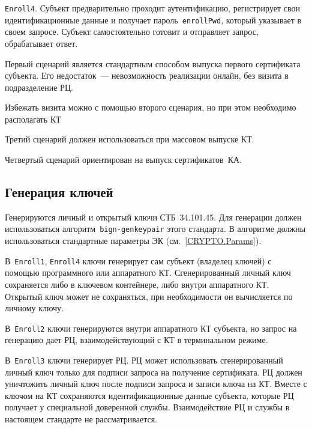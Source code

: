 \texttt{Enroll4}.
Субъект предварительно проходит аутентификацию, регистрирует свои 
идентификационные данные и получает пароль~\texttt{enrollPwd}, 
который указывает в своем запросе. Субъект самостоятельно готовит и 
отправляет запрос, обрабатывает ответ.

Первый сценарий является стандартным способом выпуска первого сертификата
субъекта.  Его недостаток~--- невозможность реализации онлайн, 
без визита в подразделение РЦ. 

Избежать визита можно с помощью второго сценария, но при этом необходимо 
располагать КТ 

Третий сценарий должен использоваться при массовом выпуске КТ.

Четвертый сценарий ориентирован на выпуск сертификатов~КА.


\subsection{Генерация ключей}\label{PROCESSES.Enroll.Gen}

Генерируются личный и открытый ключи СТБ~34.101.45.
Для генерации должен использоваться алгоритм~\texttt{bign-genkeypair}
этого стандарта. В алгоритме должны использоваться 
стандартные параметры ЭК (см.~\ref{CRYPTO.Params}).

В~\texttt{Enroll1}, \texttt{Enroll4} ключи генерирует сам субъект 
(владелец ключей) с помощью программного или аппаратного КТ. 
Сгенерированный личный ключ сохраняется либо в ключевом контейнере, 
либо внутри аппаратного КТ. Открытый ключ может не сохраняться, 
при необходимости он вычисляется по личному ключу.

В~\texttt{Enroll2} ключи генерируются внутри аппаратного КТ субъекта,
но запрос на генерацию дает РЦ, взаимодействующий с КТ в терминальном 
режиме. 

В~\texttt{Enroll3} ключи генерирует РЦ. 
РЦ может использовать сгенерированный личный ключ только для 
подписи запроса на получение сертификата. РЦ должен уничтожить личный ключ 
после подписи запроса и записи ключа на КТ.
%
Вместе с ключом на КТ сохраняются идентификационные данные субъекта,
которые РЦ получает у специальной доверенной службы. 
Взаимодействие РЦ и службы в настоящем стандарте не рассматривается.

